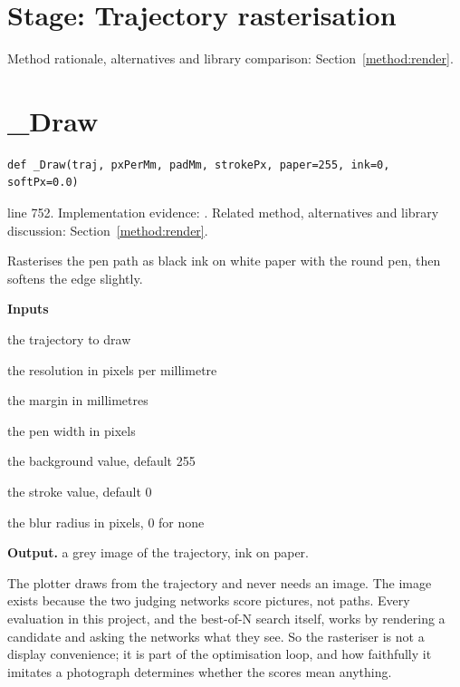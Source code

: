 \section*{Stage: Trajectory rasterisation}
Method rationale, alternatives and library comparison: Section~\ref{method:render}.
\section{\_Draw}\label{fn:synthesise:-Draw}
\begin{lstlisting}[style=sig]
def _Draw(traj, pxPerMm, padMm, strokePx, paper=255, ink=0, softPx=0.0)
\end{lstlisting}
 line 752. Implementation evidence: \cite{code2026}. Related method, alternatives and library discussion: Section~\ref{method:render}.


Rasterises the pen path as black ink on white paper with the round pen, then softens the edge slightly.




\noindent\textbf{Inputs}
\begin{description}[leftmargin=2.2em,style=nextline,font=\normalfont\ttfamily]\setlength\itemsep{1pt}
  \item[{traj}] \normalfont the trajectory to draw
  \item[{pxPerMm}] \normalfont the resolution in pixels per millimetre
  \item[{padMm}] \normalfont the margin in millimetres
  \item[{strokePx}] \normalfont the pen width in pixels
  \item[{paper}] \normalfont the background value, default 255
  \item[{ink}] \normalfont the stroke value, default 0
  \item[{softPx}] \normalfont the blur radius in pixels, 0 for none
\end{description}

\noindent\textbf{Output.} a grey image of the trajectory, ink on paper.


The plotter draws from the trajectory and never needs an image. The image exists because the two judging networks score pictures, not paths. Every evaluation in this project, and the best-of-N search itself, works by rendering a candidate and asking the networks what they see. So the rasteriser is not a display convenience; it is part of the optimisation loop, and how faithfully it imitates a photograph determines whether the scores mean anything.



